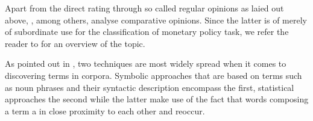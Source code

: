 Apart from the direct rating through so called regular opinions as laied out above, \textcite{Ding.2009,Ganapathibhotla.2008,Jindal.2006}, among others, analyse comparative opinions. Since the latter is of merely of subordinate use for the classification of monetary policy task, we refer the reader to \textcite{Liu.2012} for an overview of the topic. 

%
As pointed out in \textcite{Hu.2004}, two techniques are most widely spread when it comes to discovering terms in corpora. Symbolic approaches that are based on terms such as noun phrases and their syntactic description encompass the first, statistical approaches the second while the latter make use of the fact that words composing a term a in close proximity to each other and reoccur. 

